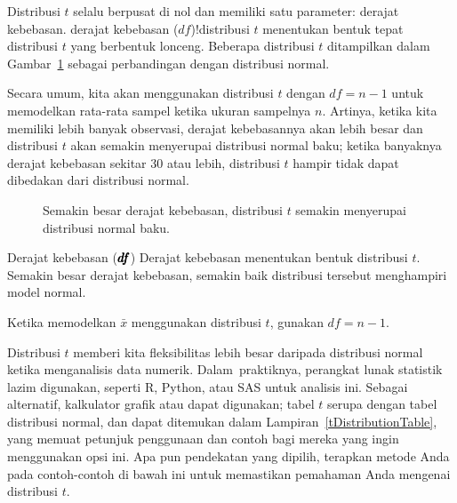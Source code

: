 Distribusi $t$ selalu berpusat di nol dan
memiliki satu parameter: derajat kebebasan.
    {derajat kebebasan ($df$)!distribusi $t$}
menentukan bentuk tepat distribusi $t$ yang berbentuk lonceng.
Beberapa distribusi $t$ ditampilkan dalam
Gambar~\ref{tDistConvergeToNormalDist}
sebagai perbandingan dengan distribusi normal.

Secara umum, kita akan menggunakan distribusi $t$
dengan $df = n - 1$ untuk memodelkan rata-rata sampel
ketika ukuran sampelnya $n$.
Artinya, ketika kita memiliki lebih banyak observasi,
derajat kebebasannya akan lebih besar dan
distribusi $t$ akan semakin menyerupai
distribusi normal baku;
ketika banyaknya derajat kebebasan sekitar 30 atau lebih,
distribusi $t$ hampir tidak dapat dibedakan
dari distribusi normal.

\begin{figure}[h]
  \centering
  \caption{Semakin besar derajat kebebasan,
      distribusi $t$ semakin menyerupai distribusi
      normal baku.}
  \label{tDistConvergeToNormalDist}
\end{figure}

\begin{onebox}{Derajat kebebasan
    ($\pmb{\MakeLowercase{df}}$)}
  Derajat kebebasan menentukan bentuk
  distribusi $t$.
  Semakin besar derajat kebebasan, semakin baik
  distribusi tersebut menghampiri model normal. \stdvspace{}

  Ketika memodelkan $\bar{x}$ menggunakan distribusi $t$,
  gunakan $df = n - 1$.
\end{onebox}


Distribusi $t$ memberi kita fleksibilitas lebih besar daripada
distribusi normal ketika menganalisis data numerik.
Dalam~praktiknya, perangkat lunak statistik lazim digunakan,
seperti R, Python, atau SAS untuk analisis ini.
Sebagai alternatif, kalkulator grafik atau
 dapat digunakan;
tabel $t$ serupa dengan tabel distribusi normal,
dan dapat ditemukan dalam Lampiran~\ref{tDistributionTable},
yang memuat petunjuk penggunaan dan contoh
bagi mereka yang ingin menggunakan opsi ini.
Apa pun pendekatan yang dipilih, terapkan metode Anda
pada contoh-contoh di bawah ini untuk memastikan
pemahaman Anda mengenai distribusi $t$.

